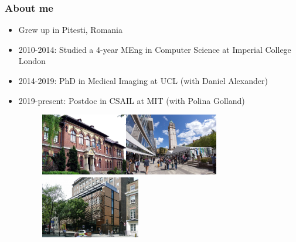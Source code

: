 \documentclass[8pt,xcolor=table,aspectratio=169]{beamer}
\begin{document}
\begin{frame}
\frametitle{About me}

\begin{itemize}
  \item Grew up in Pitesti, Romania
  \item 2010-2014: Studied a 4-year MEng in Computer Science at Imperial College London
  \item 2014-2019: PhD in Medical Imaging at UCL (with Daniel Alexander)
  \item 2019-present: Postdoc in CSAIL at MIT (with Polina Golland)

  \begin{figure}
  \vspace{1em}
  \includegraphics[height=2.7cm]{bratianu}\hspace{1em}\includegraphics[height=2.7cm]{imperial.jpg}\hspace{1em}\includegraphics[height=2.7cm,trim=0 0 0 100,clip]{uclFrontEng.jpg}
  \end{figure}
 
 \vspace{1em}

 
 



\end{itemize}

\end{frame}
\end{document}
